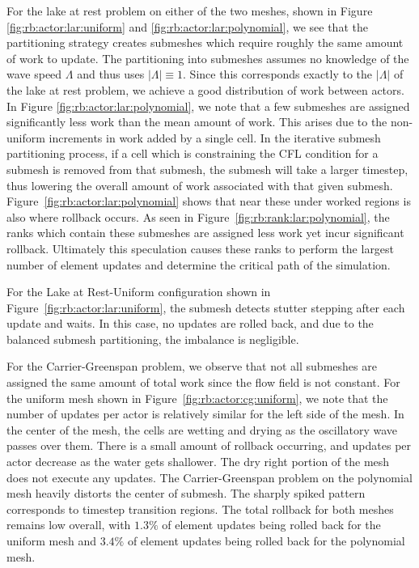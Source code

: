 { For the lake at rest problem on either of the two meshes, shown in Figure \ref{fig:rb:actor:lar:uniform} and \ref{fig:rb:actor:lar:polynomial}, we see that the partitioning strategy creates submeshes which require roughly the same amount of work to update. The partitioning into submeshes assumes no knowledge of the wave speed $\Lambda$ and thus uses $|\Lambda|\equiv 1$. Since this corresponds exactly to the $|\Lambda|$ of the lake at rest problem, we achieve a good distribution of work between actors. In Figure \ref{fig:rb:actor:lar:polynomial}, we note that a few submeshes are assigned significantly less work than the mean amount of work. This arises due to the non-uniform increments in work added by a single cell. In the iterative submesh partitioning process, if a cell which is constraining the CFL condition for a submesh is removed from that submesh, the submesh will take a larger timestep, thus lowering the overall amount of work associated with that given submesh. Figure~\ref{fig:rb:actor:lar:polynomial} shows that near these under worked regions is also where rollback occurs. As seen in Figure~\ref{fig:rb:rank:lar:polynomial}, the ranks which contain these submeshes are assigned less work yet incur significant rollback. Ultimately this speculation causes these ranks to perform the largest number of element updates and determine the critical path of the simulation.
 
For the Lake at Rest-Uniform configuration shown in Figure~\ref{fig:rb:actor:lar:uniform}, the submesh detects stutter stepping after each update and waits. In this case, no updates are rolled back, and due to the balanced submesh partitioning, the imbalance is negligible.


For the Carrier-Greenspan problem, we observe that not all submeshes are assigned the same amount of total work since the flow field is not constant. For the uniform mesh shown in Figure~\ref{fig:rb:actor:cg:uniform}, we note that the number of updates per actor is relatively similar for the left side of the mesh. In the center of the mesh, the cells are wetting and drying as the oscillatory wave passes over them. 
There is a small amount of rollback occurring, and updates per actor decrease as the water gets shallower. The dry right portion of the mesh does not execute any updates. The Carrier-Greenspan problem on the polynomial mesh heavily distorts the center of submesh. The sharply spiked pattern corresponds to timestep transition regions. The total rollback for both meshes remains low overall, with $1.3\%$ of element updates being rolled back for the uniform mesh and $3.4\%$ of element updates being rolled back for the polynomial mesh. 

}
